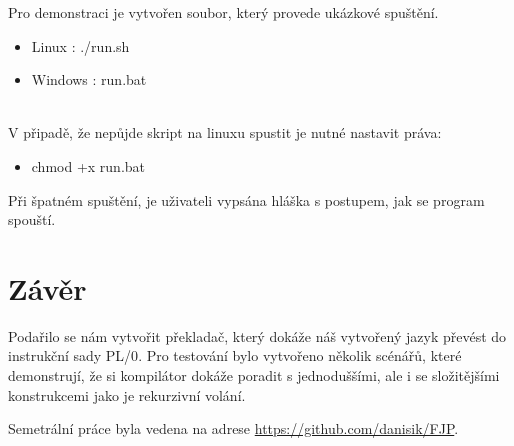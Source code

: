 \documentclass[12pt, a4paper]{article}
\begin{document}
\noindent Pro demonstraci je vytvořen soubor, který provede ukázkové spuštění.
\begin{itemize}
  \item Linux : ./run.sh
  \item Windows : run.bat
\end{itemize}

\mbox{}\\
\noindent V připadě, že nepůjde skript na linuxu spustit je nutné nastavit práva:
\begin{itemize}
\item chmod +x run.bat
\end{itemize}

\noindent Při špatném spuštění, je uživateli vypsána hláška s postupem, jak se program spouští.


\section{Závěr}
Podařilo se nám vytvořit překladač, který dokáže náš vytvořený jazyk převést do instrukční sady \textsf{PL/0}. Pro testování bylo vytvořeno několik scénářů, které demonstrují, že si kompilátor dokáže poradit s jednoduššími, ale i se složitějšími konstrukcemi jako je rekurzivní volání.

Semetrální práce byla vedena na adrese \href{https://github.com/danisik/FJP}{https://github.com/danisik/FJP}.
\end{document}

